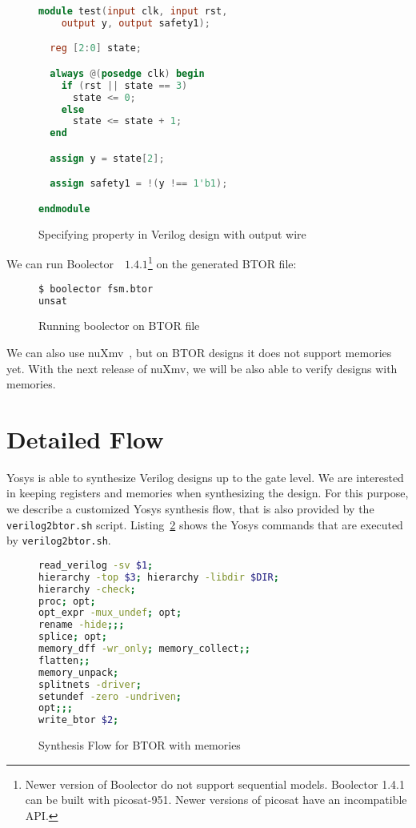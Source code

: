\documentclass[9pt,technote,a4paper]{IEEEtran}
\begin{document}
\begin{figure}[H]
\begin{lstlisting}[language=Verilog,numbers=none]
module test(input clk, input rst,
    output y, output safety1);

  reg [2:0] state;

  always @(posedge clk) begin
    if (rst || state == 3)
      state <= 0;
    else
      state <= state + 1;
  end

  assign y = state[2];

  assign safety1 = !(y !== 1'b1);

endmodule
\end{lstlisting}
\renewcommand{\figurename}{Listing}
\caption{Specifying property in Verilog design with output wire}
\label{specifying_property_output}
\end{figure}

We can run Boolector~\cite{boolector}~$1.4.1$\footnote{
Newer version of Boolector do not support sequential models.
Boolector 1.4.1 can be built with picosat-951. Newer versions
of picosat have an incompatible API.} on the generated BTOR
file:

\begin{figure}[H]
\begin{lstlisting}[language=sh,numbers=none]
$ boolector fsm.btor
unsat
\end{lstlisting}
 \renewcommand{\figurename}{Listing}
\caption{Running boolector on BTOR file}
\end{figure}

We can also use nuXmv~\cite{nuxmv}, but on BTOR designs it does not
support memories yet. With the next release of nuXmv, we will be also
able to verify designs with memories.

\section{Detailed Flow}

Yosys is able to synthesize Verilog designs up to the gate level.
We are interested in keeping registers and memories when synthesizing
the design. For this purpose, we describe a customized Yosys synthesis
flow, that is also provided by the {\tt verilog2btor.sh} script.
Listing~\ref{btor_script_memory} shows the Yosys commands that are
executed by {\tt verilog2btor.sh}.

\begin{figure}[H]
\begin{lstlisting}[language=sh]
read_verilog -sv $1;
hierarchy -top $3; hierarchy -libdir $DIR;
hierarchy -check;
proc; opt;
opt_expr -mux_undef; opt;
rename -hide;;;
splice; opt;
memory_dff -wr_only; memory_collect;;
flatten;;
memory_unpack;
splitnets -driver;
setundef -zero -undriven;
opt;;;
write_btor $2;
\end{lstlisting}
 \renewcommand{\figurename}{Listing}
\caption{Synthesis Flow for BTOR with memories}
\label{btor_script_memory}
\end{figure}
\end{document}

